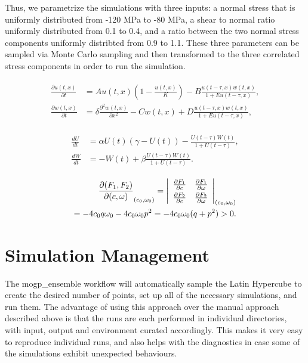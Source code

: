 \documentclass[openacc]{rstransa}%
\begin{document}
Thus, we parametrize the simulations with three inputs: a normal stress that is uniformly distributed from -120 MPa to -80 MPa, a shear to normal ratio uniformly distributed from 0.1 to 0.4, and a ratio between the two normal stress components uniformly distribted from 0.9 to 1.1. These three parameters can be sampled via Monte Carlo sampling and then transformed to the three correlated stress components in order to run the simulation.

\begin{align}\label{1.1}
\begin{split}
\frac{\partial u(t,x)}{\partial t} &= Au(t,x) \left(1-\frac{u(t,x)}{K}\right)-B\frac{u(t-\tau,x) w(t,x)}{1+Eu(t-\tau,x)},\\
\frac{\partial w(t,x)}{\partial t} &=\delta \frac{\partial^2w(t,x)}{\partial x^2}-Cw(t,x)+D\frac{u(t-\tau,x)w(t,x)}{1+Eu(t-\tau,x)},
\end{split}
\end{align}

\begin{align}\label{1.2}
\begin{split}
\frac{dU}{dt} &=\alpha U(t)(\gamma -U(t))-\frac{U(t-\tau)W(t)}{1+U(t-\tau)},\\
\frac{dW}{dt} &=-W(t)+\beta\frac{U(t-\tau)W(t)}{1+U(t-\tau)}.
\end{split}
\end{align}

\begin{eqnarray}
\frac{\partial(F_1,F_2)}{\partial(c,\omega)}_{(c_0,\omega_0)} = \left|
\begin{array}{ll}
\frac{\partial F_1}{\partial c} &\frac{\partial F_1}{\partial \omega} \\\noalign{\vskip3pt}
\frac{\partial F_2}{\partial c}&\frac{\partial F_2}{\partial \omega}
\end{array}\right|_{(c_0,\omega_0)}\notag\\
=-4c_0q\omega_0 -4c_0\omega_0p^2 =-4c_0\omega_0(q+p^2)>0.
\end{eqnarray}

\section{Simulation Management}

The mogp\_ensemble workflow will automatically sample the Latin Hypercube to create the desired number of points, set up all of the necessary simulations, and run them. The advantage of using this approach over the manual approach described above is that the runs are each performed in individual directories, with input, output and environment curated accordingly. This makes it very easy to reproduce individual runs, and also helps with the diagnostics in case some of the simulations exhibit unexpected behaviours.
\end{document}
